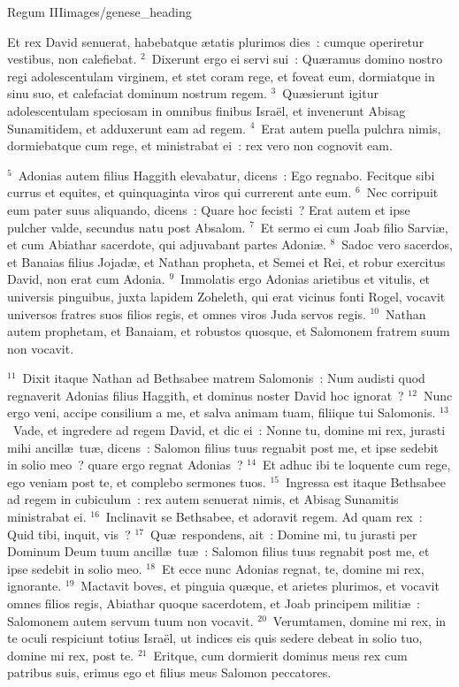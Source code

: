 {Regum III}{images/genese_heading}


\lettrine[lines=10,image=true,loversize=0.05,lraise=-0.03]{E}{}t rex David senuerat, habebatque \ae tatis plurimos dies~: cumque operiretur vestibus, non calefiebat.
${}^{2}$~Dixerunt ergo ei servi sui~: Qu\ae ramus domino nostro regi adolescentulam virginem, et stet coram rege, et foveat eum, dormiatque in sinu suo, et calefaciat dominum nostrum regem.
${}^{3}$~Qu\ae sierunt igitur adolescentulam speciosam in omnibus finibus Isra\"el, et invenerunt Abisag Sunamitidem, et adduxerunt eam ad regem.
${}^{4}$~Erat autem puella pulchra nimis, dormiebatque cum rege, et ministrabat ei~: rex vero non cognovit eam.


${}^{5}$~Adonias autem filius Haggith elevabatur, dicens~: Ego regnabo. Fecitque sibi currus et equites, et quinquaginta viros qui currerent ante eum.
${}^{6}$~Nec corripuit eum pater suus aliquando, dicens~: Quare hoc fecisti~? Erat autem et ipse pulcher valde, secundus natu post Absalom.
${}^{7}$~Et sermo ei cum Joab filio Sarvi\ae , et cum Abiathar sacerdote, qui adjuvabant partes Adoni\ae .
${}^{8}$~Sadoc vero sacerdos, et Banaias filius Jojad\ae , et Nathan propheta, et Semei et Rei, et robur exercitus David, non erat cum Adonia.
${}^{9}$~Immolatis ergo Adonias arietibus et vitulis, et universis pinguibus, juxta lapidem Zoheleth, qui erat vicinus fonti Rogel, vocavit universos fratres suos filios regis, et omnes viros Juda servos regis.
${}^{10}$~Nathan autem prophetam, et Banaiam, et robustos quosque, et Salomonem fratrem suum non vocavit.


${}^{11}$~Dixit itaque Nathan ad Bethsabee matrem Salomonis~: Num audisti quod regnaverit Adonias filius Haggith, et dominus noster David hoc ignorat~?
${}^{12}$~Nunc ergo veni, accipe consilium a me, et salva animam tuam, filiique tui Salomonis.
${}^{13}$~Vade, et ingredere ad regem David, et dic ei~: Nonne tu, domine mi rex, jurasti mihi ancill\ae\ tu\ae , dicens~: Salomon filius tuus regnabit post me, et ipse sedebit in solio meo~? quare ergo regnat Adonias~?
${}^{14}$~Et adhuc ibi te loquente cum rege, ego veniam post te, et complebo sermones tuos.
${}^{15}$~Ingressa est itaque Bethsabee ad regem in cubiculum~: rex autem senuerat nimis, et Abisag Sunamitis ministrabat ei.
${}^{16}$~Inclinavit se Bethsabee, et adoravit regem. Ad quam rex~: Quid tibi, inquit, vis~?
${}^{17}$~Qu\ae\ respondens, ait~: Domine mi, tu jurasti per Dominum Deum tuum ancill\ae\ tu\ae~: Salomon filius tuus regnabit post me, et ipse sedebit in solio meo.
${}^{18}$~Et ecce nunc Adonias regnat, te, domine mi rex, ignorante.
${}^{19}$~Mactavit boves, et pinguia qu\ae que, et arietes plurimos, et vocavit omnes filios regis, Abiathar quoque sacerdotem, et Joab principem militi\ae~: Salomonem autem servum tuum non vocavit.
${}^{20}$~Verumtamen, domine mi rex, in te oculi respiciunt totius Isra\"el, ut indices eis quis sedere debeat in solio tuo, domine mi rex, post te.
${}^{21}$~Eritque, cum dormierit dominus meus rex cum patribus suis, erimus ego et filius meus Salomon peccatores.


